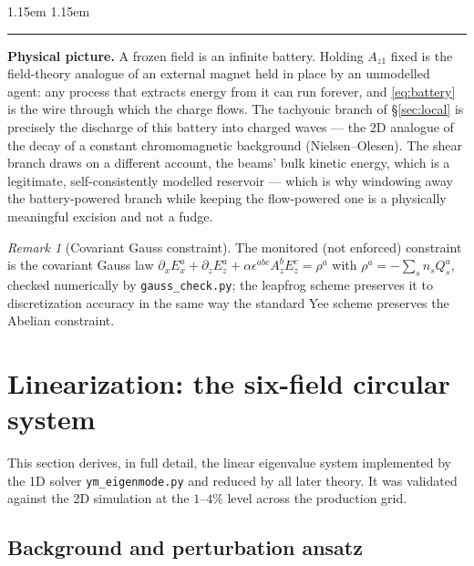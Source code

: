 \documentclass[11pt,a4paper]{article}
\numberwithin{equation}{section}
\theoremstyle{remark}
\newtheorem{remark}[lemma]{Remark}
\newenvironment{intuition}%
{\par\medskip\noindent
 \begin{list}{}{\leftmargin 1.15em \rightmargin 1.15em \listparindent 0pt
 \itemindent 0pt \parsep 2pt \topsep 2pt}\item\relax
 \small\textcolor{intu}{\rule[-0.6ex]{2.6pt}{2.4ex}}\hspace{0.55em}%
 \textcolor{intu}{\textbf{Physical picture.}}\hspace{0.5em}\ignorespaces}%
{\end{list}\medskip}
\newcommand{\Az}{A_{z1}}
\begin{document}
\begin{intuition}
A frozen field is an infinite battery. Holding $\Az$ fixed is the
field-theory analogue of an external magnet held in place by an
unmodelled agent: any process that extracts energy from it can run
forever, and \eqref{eq:battery} is the wire through which the charge
flows. The tachyonic branch of \S\ref{sec:local} is precisely the
discharge of this battery into charged waves --- the 2D analogue of the
decay of a constant chromomagnetic background (Nielsen--Olesen). The
shear branch draws on a different account, the beams' bulk kinetic
energy, which is a legitimate, self-consistently modelled reservoir ---
which is why windowing away the battery-powered branch while keeping the
flow-powered one is a physically meaningful excision and not a fudge.
\end{intuition}

\begin{remark}[Covariant Gauss constraint]
The monitored (not enforced) constraint is the covariant Gauss law
$\partial_xE_x^a+\partial_zE_z^a+\alpha\epsilon^{abc}A_z^bE_z^c=\rho^a$ with
$\rho^a=-\sum_sn_sQ^a_s$, checked numerically by \texttt{gauss\_check.py};
the leapfrog scheme preserves it to discretization accuracy in the same way
the standard Yee scheme preserves the Abelian constraint.
\end{remark}
\section{Linearization: the six-field circular system}
\label{sec:sixfield}

This section derives, in full detail, the linear eigenvalue system
implemented by the 1D solver \texttt{ym\_eigenmode.py} and reduced by all
later theory. It was validated against the 2D simulation at the
$1$--$4\%$ level across the production grid.

\subsection{Background and perturbation ansatz}
\end{document}

